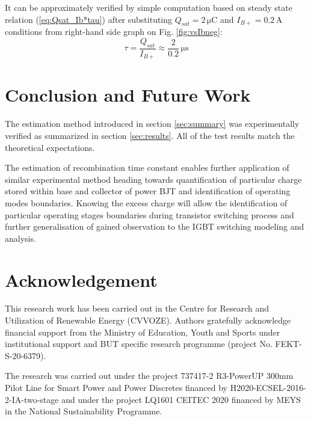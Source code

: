 \documentclass{eeict}
\newcommand{\un}[1]{\, \mathrm{#1}}	%
\newcommand{\myfigsc}[3]
{
    \begin{figure}[!ht]
	\centering
	\texttt{[image: \#1]}
	\caption{#2}
	#3
    \end{figure}
}
\newcommand{\myfigdual}[4]
{
    \begin{figure}[!ht]
	\centering
	\texttt{[image: \#1]}
	\texttt{[image: \#2]}
	\caption{#3}
	#4
    \end{figure}
}
\begin{document}
It can be approximately verified by simple computation based on steady state relation (\ref{eq:Qsat_Ib*tau}) after substituting $Q_{sat}=2\un{\mu C}$ and $I_{B+}=0.2\un{A}$ conditions from right-hand side graph on Fig. \ref{fig:vsIbneg}:
\begin{equation}
    \tau = \frac{Q_{sat}}{I_{B+}} \approx \frac{2}{0.2} \un{\mu s}
    \label{eq:tau_result2}
\end{equation}


\section{Conclusion and Future Work}

The estimation method introduced in section \ref{sec:summary} was experimentally verified as summarized in section \ref{sec:results}.
All of the test results match the theoretical expectations.

The estimation of recombination time constant enables further application of similar experimental method heading towards quantification of particular charge stored within base and collector of power BJT and identification of operating modes boundaries. Knowing the excess charge will allow the identification of particular operating stages boundaries during transistor switching process and further generalisation of gained observation to the IGBT switching modeling and analysis.




\section*{Acknowledgement}
This research work has been carried out in the Centre for Research and
Utilization of Renewable Energy (CVVOZE).  Authors gratefully acknowledge
financial support from the Ministry of Education, Youth and Sports under
institutional support and BUT specific research programme (project No.
FEKT-S-20-6379).

The research was carried out under the project 737417-2 R3-PowerUP
300mm Pilot Line for Smart Power and Power Discretes financed by
H2020-ECSEL-2016-2-IA-two-stage and under the project LQ1601 CEITEC
2020 financed by MEYS in the National Sustainability Programme.
\end{document}
